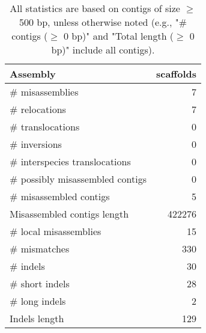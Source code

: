 \documentclass[12pt,a4paper]{article}
\begin{document}
\begin{table}[ht]
\begin{center}
\caption{All statistics are based on contigs of size $\geq$ 500 bp, unless otherwise noted (e.g., "\# contigs ($\geq$ 0 bp)" and "Total length ($\geq$ 0 bp)" include all contigs).}
\begin{tabular}{|l*{1}{|r}|}
\hline
Assembly & scaffolds \\ \hline
\# misassemblies & 7 \\ \hline
\hspace{5mm}\# relocations & 7 \\ \hline
\hspace{5mm}\# translocations & 0 \\ \hline
\hspace{5mm}\# inversions & 0 \\ \hline
\hspace{5mm}\# interspecies translocations & 0 \\ \hline
\# possibly misassembled contigs & 0 \\ \hline
\# misassembled contigs & 5 \\ \hline
Misassembled contigs length & 422276 \\ \hline
\# local misassemblies & 15 \\ \hline
\# mismatches & 330 \\ \hline
\# indels & 30 \\ \hline
\hspace{5mm}\# short indels & 28 \\ \hline
\hspace{5mm}\# long indels & 2 \\ \hline
Indels length & 129 \\ \hline
\end{tabular}
\end{center}
\end{table}
\end{document}
